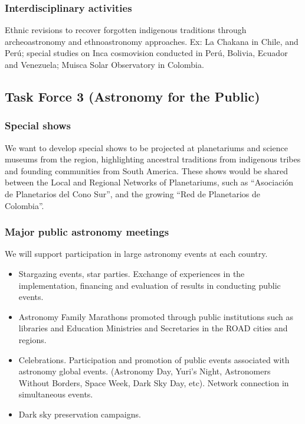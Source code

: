 \documentclass[12pt]{article}
\begin{document}
\subsubsection*{Interdisciplinary activities}
Ethnic revisions to recover forgotten indigenous traditions through
archeoastronomy and ethnoastronomy approaches. Ex: La Chakana in
Chile, and Perú; special studies on Inca cosmovision conducted in
Perú, Bolivia, Ecuador and Venezuela; Muisca Solar Observatory in
Colombia.  

\subsection{Task Force 3 (Astronomy for the Public)}


\subsubsection*{Special shows} 

We want to develop special shows to be projected at planetariums and
science museums from the region, highlighting ancestral traditions
from indigenous tribes and founding communities from South
America. These shows would be shared between the Local and Regional
Networks of Planetariums, such as “Asociación de Planetarios del Cono
Sur”, and the growing “Red de Planetarios de Colombia”.  

\subsubsection*{Major public astronomy meetings} 

We will support participation in large astronomy events at each
country. 

\begin{itemize}
\item Stargazing events, star parties. Exchange of experiences in
the implementation, financing and evaluation of results in conducting
public events. 
\item Astronomy Family Marathons promoted through public institutions
  such as libraries and Education Ministries and Secretaries in the
  ROAD cities and regions. 

\item Celebrations. Participation and promotion of public events
  associated with astronomy global events. (Astronomy Day, Yuri's
  Night, Astronomers Without Borders, Space Week, Dark Sky Day,
  etc). Network connection in simultaneous events.  
\item Dark sky preservation campaigns.
\end{itemize}
\end{document}
